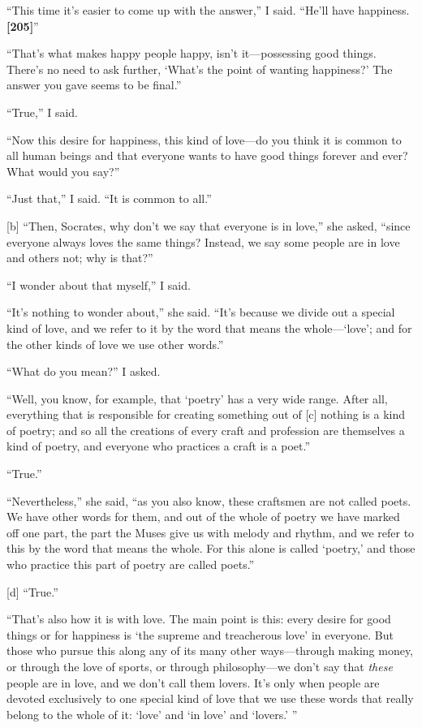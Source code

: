 “This time it's easier to come up with the answer,” I said. “He'll have
happiness.
{\bf {[}205{]}}”

“That's what makes happy people happy, isn't it---possessing good
things. There's no need to ask further, ‘What's the point of wanting
happiness?' The answer you gave seems to be final.”

“True,” I said.

“Now this desire for happiness, this kind of love---do you think it is
common to all human beings and that everyone wants to have good things
forever and ever? What would you say?”

“Just that,” I said. “It is common to all.”

{[}b{]} “Then, Socrates, why don't we say that everyone is in love,” she
asked, “since everyone always loves the same things? Instead, we say
some people are in love and others not; why is that?”

“I wonder about that myself,” I said.

“It's nothing to wonder about,” she said. “It's because we divide out a
special kind of love, and we refer to it by the word that means the
whole---‘love'; and for the other kinds of love we use other words.”

“What do you mean?” I asked.

“Well, you know, for example, that ‘poetry' has a very wide
range. After all,
everything that is responsible for creating something out of {[}c{]}
nothing is a kind of poetry; and so all the creations of every craft and
profession are themselves a kind of poetry, and everyone who practices a
craft is a poet.”

“True.”

“Nevertheless,” she said, “as you also know, these craftsmen are not
called poets. We have other words for them, and out of the whole of
poetry we have marked off one part, the part the Muses give us with
melody and rhythm, and we refer to this by the word that means the
whole. For this alone is called ‘poetry,' and those who practice this
part of poetry are called poets.”

{[}d{]} “True.”

“That's also how it is with love. The main point is this: every desire
for good things or for happiness is ‘the supreme and treacherous love'
in everyone. But those who pursue this along any of its many other
ways---through making money, or through the love of sports, or through
philosophy---we don't say that {\em these} people are in love, and we
don't call them lovers. It's only when people are devoted exclusively to
one special kind of love that we use these words that really belong to
the whole of it: ‘love' and ‘in love' and ‘lovers.' ”

